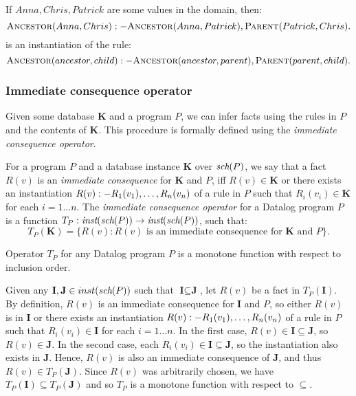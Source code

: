 \begin{exmp}
If $Anna, Chris, Patrick$ are some values in the domain, then:
$$\textsc{Ancestor}(Anna, Chris) :- \textsc{Ancestor} (Anna, Patrick), \textsc{Parent} (Patrick, Chris).$$
is an instantiation of the rule: 
$$\textsc{Ancestor} (ancestor, child) :- \textsc{Ancestor} (ancestor, parent), \textsc{Parent} (parent, child).$$
\end{exmp}

\subsubsection{Immediate consequence operator}
Given some database $\textbf{K}$ and a program $P$, we can infer facts using the rules in $P$ and the contents of $\textbf{K}$. This procedure is formally defined using the \emph{immediate consequence operator}.

\begin{defn}

For a program $P$ and a database instance $\textbf{K}$ over $\textit{sch}(P)$, we say that a fact $R(v)$ is an \emph{immediate consequence} for $\textbf{K}$ and $P$, iff $R(v) \in \textbf{K}$ or there exists an instantiation $R(v) :- R_1(v_1), \dots, R_n(v_n)$ of a rule in $P$ such that $R_i(v_i) \in \textbf{K}$ for each $i = 1\dots n$. The \emph{immediate consequence operator} for a Datalog program $P$ is a function $T_P: \textit{inst}(\textit{sch}(P)) \to \textit{inst}(\textit{sch}(P))$, such that:
$$T_P(\textbf{K}) = \{ R(v): R(v) \text{ is an immediate consequence for } \textbf{K} \text{ and } P \}.$$

\end{defn}

\begin{lem}
Operator $T_P$ for any Datalog program $P$ is a monotone function with respect to inclusion order.
\end{lem}
\begin{prof}
Given any $\textbf{I}, \textbf{J} \in inst(\textit{sch}(P))$ such that $\textbf{I} \subseteq \textbf{J}$, let $R(v)$ be a fact in $T_P(\textbf{I})$.
By definition, $R(v)$ is an immediate consequence for $\textbf{I}$ and $P$, so either $R(v)$ is in $\textbf{I}$ or there exists an instantiation
 $R(v) :- R_1(v_1), \dots, R_n(v_n)$ of a rule in $P$ such that $R_i(v_i) \in \textbf{I}$ for each $i = 1\dots n$. 
In the first case, $R(v) \in \textbf{I} \subseteq \textbf{J}$, so $R(v) \in \textbf{J}$. 
In the second case, each $R_i(v_i) \in \textbf{I} \subseteq \textbf{J}$, so the instantiation also exists in $\textbf{J}$. 
Hence, $R(v)$ is also an immediate consequence of $\textbf{J}$, and thus $R(v) \in T_P(\textbf{J})$. 
Since $R(v)$ was arbitrarily chosen, we have  $T_P(\textbf{I}) \subseteq T_P(\textbf{J})$ and so $T_P$ is a monotone function with respect to $\subseteq$.
\QEDA
\end{prof}

